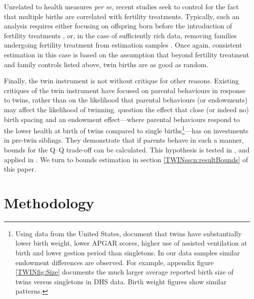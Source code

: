 \documentclass[subeqn]{article}
\begin{document}
\begin{spacing}{1.4}
Unrelated to health measures \emph{per se}, recent studies seek to control for 
the fact that multiple births are correlated with fertility treatments. 
Typically, such an analysis requires either focusing on offspring born before
the introduction of fertility treatments \citep{Caceres2006,Angristetal2010}, 
or, in the case of sufficiently rich data, removing families undergoing fertility 
treatment from estimation samples \citep{Braakman2014}. Once again, consistent 
estimation in this case is based on the assumption that beyond fertility 
treatment and family controls listed above, twin births are as good as random.

Finally, the twin instrument is not without critique for other reasons. Existing
critiques of the twin instrument have focused on parental behaviours in response 
to twins, rather than on the likelihood that parental behaviours (or endowments) 
may affect the likelihood of twinning. \citet{RosenzweigZhang2009} question the 
effect that close (or indeed no) birth spacing and an endowment effect---where 
parental behaviours respond to the lower health at birth of twins compared to 
single births\footnote{Using data from the United States, \citet{Almondetal2005} 
document that twins have substantially lower birth weight, lower APGAR scores, 
higher use of assisted ventilation at birth and lower gestion period than 
singletons. In our data samples similar endowment differences are observed. For
example, appendix figure \ref{TWINfig:Size} documents the much larger average 
reported birth size of twins versus singletons in DHS data. Birth weight figures 
show similar patterns.}---has on investments in pre-twin siblings. They 
demonstrate that if parents behave in such a manner, bounds for the Q--Q 
trade-off can be calculated. This hypothesis is tested in 
\citet{Angristetal2010}, and applied in \citet{FitzsimonsMalde2014}.  We turn
to bounds estimation in section \ref{TWINsscn:resultBounds} of this paper.


\section{Methodology}
\label{TWINscn:method}

\end{spacing}
\end{document}
